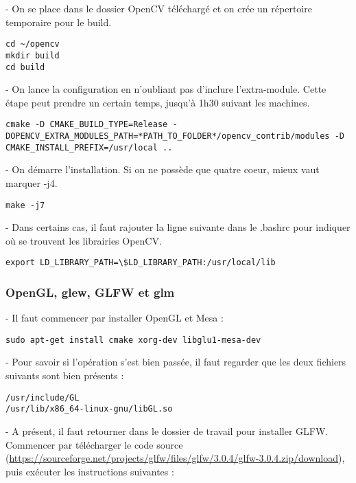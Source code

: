 - On se place dans le dossier OpenCV téléchargé et on crée un répertoire temporaire pour le build.

\begin{verbatim}
cd ~/opencv
mkdir build
cd build
\end{verbatim}

- On lance la configuration en n'oubliant pas d'inclure l'extra-module. Cette étape peut prendre un certain temps, jusqu'à 1h30 suivant les machines.

\begin{verbatim}
cmake -D CMAKE_BUILD_TYPE=Release -DOPENCV_EXTRA_MODULES_PATH=*PATH_TO_FOLDER*/opencv_contrib/modules -D CMAKE_INSTALL_PREFIX=/usr/local ..
\end{verbatim}

- On démarre l'installation. Si on ne possède que quatre coeur, mieux vaut marquer -j4.

\begin{verbatim}
make -j7
\end{verbatim}

- Dans certains cas, il faut rajouter la ligne suivante dans le .bashrc pour indiquer où se trouvent les librairies OpenCV.

\begin{verbatim}
export LD_LIBRARY_PATH=\$LD_LIBRARY_PATH:/usr/local/lib
\end{verbatim}


\subsubsection{OpenGL, glew, GLFW et glm}

- Il faut commencer par installer OpenGL et Mesa :

\begin{verbatim}
sudo apt-get install cmake xorg-dev libglu1-mesa-dev
\end{verbatim}

- Pour savoir si l'opération s'est bien passée, il faut regarder que les deux fichiers suivants sont bien présents :

\begin{verbatim}
/usr/include/GL
/usr/lib/x86_64-linux-gnu/libGL.so
\end{verbatim}

- A présent, il faut retourner dans le dossier de travail pour installer GLFW. Commencer par télécharger le code source (\url{https://sourceforge.net/projects/glfw/files/glfw/3.0.4/glfw-3.0.4.zip/download}), puis exécuter les instructions suivantes :

